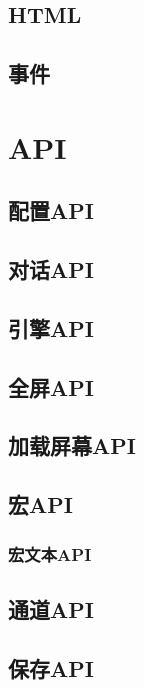 \documentclass[hyperref,UTF8]{ctexart}
\begin{document}
\newpage
\subsection{HTML}

\newpage
\subsection{事件}

\newpage
\section{API}
\subsection{配置API}

\newpage
\subsection{对话API}

\newpage
\subsection{引擎API}

\newpage
\subsection{全屏API}

\newpage
\subsection{加载屏幕API}

\newpage
\subsection{宏API}

\subsubsection{宏文本API}

\newpage
\subsection{通道API}

\newpage
\subsection{保存API}
\end{document}
